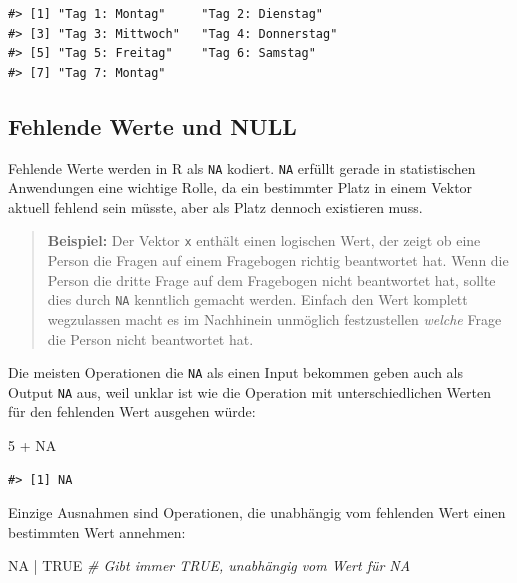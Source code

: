 \documentclass[]{tufte-book}
\newenvironment{Shaded}{}{}
\newcommand{\DecValTok}[1]{\textcolor[rgb]{0.25,0.63,0.44}{#1}}
\newcommand{\StringTok}[1]{\textcolor[rgb]{0.25,0.44,0.63}{#1}}
\newcommand{\CommentTok}[1]{\textcolor[rgb]{0.38,0.63,0.69}{\textit{#1}}}
\newcommand{\OtherTok}[1]{\textcolor[rgb]{0.00,0.44,0.13}{#1}}
\newcommand{\OperatorTok}[1]{\textcolor[rgb]{0.40,0.40,0.40}{#1}}
\begin{document}
\begin{verbatim}
#> [1] "Tag 1: Montag"     "Tag 2: Dienstag"  
#> [3] "Tag 3: Mittwoch"   "Tag 4: Donnerstag"
#> [5] "Tag 5: Freitag"    "Tag 6: Samstag"   
#> [7] "Tag 7: Montag"
\end{verbatim}

\subsection{Fehlende Werte und NULL}\label{fehlende-werte-und-null}

Fehlende Werte werden in R als \texttt{NA} kodiert. \texttt{NA} erfüllt
gerade in statistischen Anwendungen eine wichtige Rolle, da ein
bestimmter Platz in einem Vektor aktuell fehlend sein müsste, aber als
Platz dennoch existieren muss.

\begin{quote}
\textbf{Beispiel:} Der Vektor \texttt{x} enthält einen logischen Wert,
der zeigt ob eine Person die Fragen auf einem Fragebogen richtig
beantwortet hat. Wenn die Person die dritte Frage auf dem Fragebogen
nicht beantwortet hat, sollte dies durch \texttt{NA} kenntlich gemacht
werden. Einfach den Wert komplett wegzulassen macht es im Nachhinein
unmöglich festzustellen \emph{welche} Frage die Person nicht beantwortet
hat.
\end{quote}

Die meisten Operationen die \texttt{NA} als einen Input bekommen geben
auch als Output \texttt{NA} aus, weil unklar ist wie die Operation mit
unterschiedlichen Werten für den fehlenden Wert ausgehen würde:

\begin{Shaded}
\begin{Highlighting}[]
\DecValTok{5} \OperatorTok{+}\StringTok{ }\OtherTok{NA}
\end{Highlighting}
\end{Shaded}

\begin{verbatim}
#> [1] NA
\end{verbatim}

Einzige Ausnahmen sind Operationen, die unabhängig vom fehlenden Wert
einen bestimmten Wert annehmen:

\begin{Shaded}
\begin{Highlighting}[]
\OtherTok{NA} \OperatorTok{|}\StringTok{ }\OtherTok{TRUE}  \CommentTok{# Gibt immer TRUE, unabhängig vom Wert für NA}
\end{Highlighting}
\end{Shaded}
\end{document}
